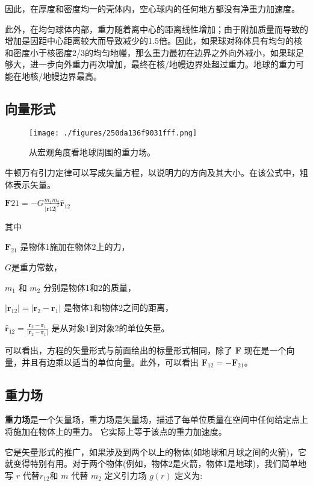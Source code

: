 因此，在厚度和密度均一的壳体内，空心球内的任何地方都没有净重力加速度。

此外，在均匀球体内部，重力随着离中心的距离线性增加；由于附加质量而导致的增加是因距中心距离较大而导致减少的1.5倍。因此，如果球对称体具有均匀的核和密度小于核密度2/3的均匀地幔，那么重力最初在边界之外向外减小，如果球足够大，进一步向外重力再次增加，最终在核/地幔边界处超过重力。地球的重力可能在地核/地幔边界最高。

\subsection{向量形式}

\begin{figure}[ht]
\centering
\texttt{[image: ./figures/250da136f9031fff.png]}
\caption{从宏观角度看地球周围的重力场。} \label{fig_UG_6}
\end{figure}

牛顿万有引力定律可以写成矢量方程，以说明力的方向及其大小。在该公式中，粗体表示矢量。

$\mathbf{F}{21} = -G \frac{m_1 m_2}{|\mathbf{r}{12}|^2} \hat{\mathbf{r}}_{12}$

其中

$\mathbf{F}_{21}$ 是物体1施加在物体2上的力，

$G$是重力常数，

$m_1$ 和 $m_2$ 分别是物体1和2的质量，

$|\mathbf{r}_{12}| = |\mathbf{r}_2 - \mathbf{r}_1|$ 是物体1和物体2之间的距离，

$\hat{\mathbf{r}}_{12} = \frac{\mathbf{r}_2 - \mathbf{r}_1}{|\mathbf{r}_2 - \mathbf{r}_1|}$ 是从对象1到对象2的单位矢量。

可以看出，方程的矢量形式与前面给出的标量形式相同，除了 $\mathbf{F}$ 现在是一个向量，并且有边乘以适当的单位向量。此外，可以看出 $\mathbf{F}_{12} = -\mathbf{F}_{21}$。

\subsection{重力场}

\textbf{重力场}是一个矢量场，重力场是矢量场，描述了每单位质量在空间中任何给定点上将施加在物体上的重力。 它实际上等于该点的重力加速度。

它是矢量形式的推广，如果涉及到两个以上的物体(如地球和月球之间的火箭)，它就变得特别有用。对于两个物体(例如，物体2是火箭，物体1是地球)，我们简单地写 $r$ 代替$r_{12}$和 $m$ 代替 $m_2$ 定义引力场 $g(r)$ 定义为:

